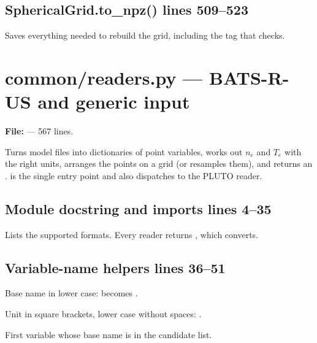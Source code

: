 \section*{\normalsize SphericalGrid.to\_npz() \hfill{\small\mdseries\color{gray}lines 509--523}}

Saves everything needed to rebuild the grid, including the  tag that  checks.


\chapter{common/readers.py --- BATS-R-US and generic input}
\label{mod:common:readers.py}
\textbf{File:}  --- 567 lines.

Turns model files into dictionaries of point variables, works out $n_e$ and $T_e$
with the right units, arranges the points on a grid (or resamples them), and returns an
.  is the single entry point and also dispatches to the PLUTO
reader.

\section*{\normalsize Module docstring and imports \hfill{\small\mdseries\color{gray}lines 4--35}}

Lists the supported formats. Every reader returns , which  converts.

\section*{\normalsize Variable-name helpers \hfill{\small\mdseries\color{gray}lines 36--51}}

\begin{lines}
\item[L.36] Base name in lower case:  becomes .
\item[L.41] Unit in square brackets, lower case without spaces: .
\item[L.46] First variable whose base name is in the candidate list.
\end{lines}
